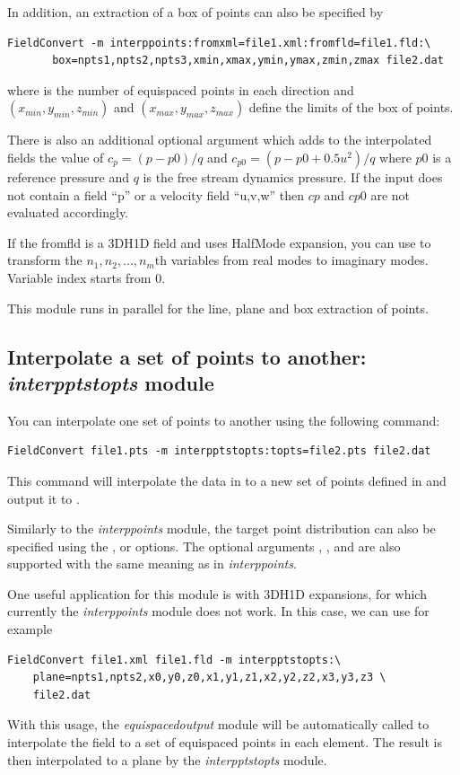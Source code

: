 In addition, an extraction of a box of points can also be specified by
\begin{lstlisting}[style=BashInputStyle]
  FieldConvert -m interppoints:fromxml=file1.xml:fromfld=file1.fld:\
       box=npts1,npts2,npts3,xmin,xmax,ymin,ymax,zmin,zmax file2.dat
\end{lstlisting}
where  is the number of equispaced points in each
direction and $(x_{min},y_{min},z_{min})$ and $(x_{max},y_{max},z_{max})$
define the limits of the box of points.

There is also an additional optional argument  which adds to the
interpolated fields the value of $c_p=(p-p0)/q$ and $c_{p0}=(p-p0+0.5 u^2)/q$
where $p0$ is a reference pressure and $q$ is the free stream dynamics pressure.
If the input does not contain a field ``p'' or a velocity field ``u,v,w'' then $cp$
and $cp0$ are not evaluated accordingly.

If the fromfld is a 3DH1D field and uses HalfMode expansion, you can use  to transform the $n_1,n_2,...,n_m$th variables from real modes to imaginary modes. Variable index starts from 0.
%
\begin{notebox}
This module  runs in parallel for the line, plane and box extraction of points.
\end{notebox}
%
%
%
\subsection{Interpolate a set of points to another: \textit{interpptstopts} module}
You can interpolate one set of points to another using the following command:
\begin{lstlisting}[style=BashInputStyle]
FieldConvert file1.pts -m interpptstopts:topts=file2.pts file2.dat
\end{lstlisting}
This command will interpolate the data in   to a new set
of points defined in \inltt{file2.pts} and output it to
.

Similarly to the \textit{interppoints} module, the target point distribution
can also be specified using the \inltt{line}, \inltt{plane} or \inltt{box}
options. The optional arguments \inltt{clamptolowervalue},
,  and  are also
supported with the same meaning as in \textit{interppoints}.

One useful application for this module is with 3DH1D expansions, for which
currently the \textit{interppoints} module does not work. In this case, we can
use for example
\begin{lstlisting}[style=BashInputStyle]
FieldConvert file1.xml file1.fld -m interpptstopts:\
    plane=npts1,npts2,x0,y0,z0,x1,y1,z1,x2,y2,z2,x3,y3,z3 \
    file2.dat
\end{lstlisting}
With this usage, the \textit{equispacedoutput} module will be automatically
called to interpolate the field to a set of equispaced points in each element.
The result is then interpolated to a plane by the \textit{interpptstopts} module.

